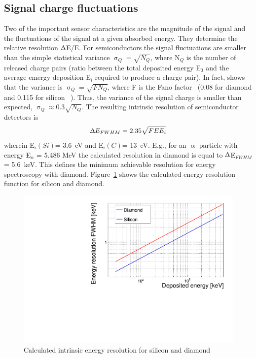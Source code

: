 \documentclass[12pt]{mytustyle}  %
\begin{document}
\subsection{Signal charge fluctuations}
Two of the important sensor characteristics are the magnitude of the signal and the fluctuations of the signal at a given absorbed energy. They determine the relative resolution $\Updelta$E/E. For semiconductors the signal fluctuations are smaller than the simple statistical variance $\upsigma_Q=\sqrt{N_Q}$, where N$_Q$ is the number of released charge pairs (ratio between the total deposited energy E$_0$ and the average emergy deposition E$_i$ required to produce a charge pair). In fact, \cite{} shows that the variance is $\upsigma_Q=\sqrt{F N_Q}$, where F is the Fano factor~\cite{} (0.08 for diamond and 0.115 for silicon ~\cite{}). Thus, the variance of the signal charge is smaller than expected, $\upsigma_Q\approx0.3 \sqrt{N_Q}$. The resulting intrinsic resolution of semiconductor detectors is 
\begin{equation}
\label{eq:efwhm}
\Updelta E_{FWHM} = 2.35 \sqrt{FEE_i} 
\end{equation} 
wherein E$_i(Si)$= 3.6~eV and E$_i(C)$= 13~eV. E.g., for an $\upalpha$ particle with energy E$_\alpha$ = 5.486 MeV the calculated resolution in diamond is equal to $\Updelta$E$_{FWHM}$ = 5.6~keV. This defines the minimum achievable resolution for energy spectroscopy with diamond. Figure~\ref{fig:enerres} shows the calculated energy resolution function for silicon and diamond.


\begin{figure}[!t]
\begin{center}
\includegraphics[width=0.45\linewidth]{../../scripts/02_pulse_formation/plots/resolution}
\caption{Calculated intrinsic energy resolution for silicon and diamond}
\label{fig:enerres}
\end{center}
\end{figure}




\clearpage
\end{document}
